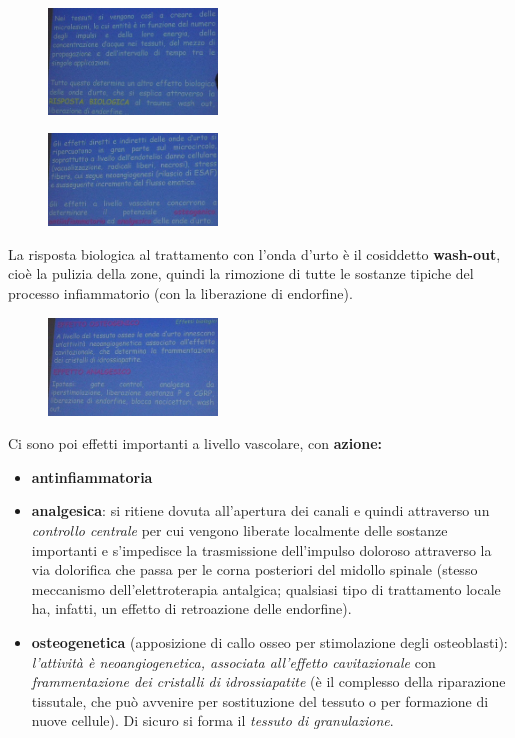 \begin{figure}[!ht]
\centering
\includegraphics[width=0.4\textwidth]{025/image13.jpeg}
\end{figure}

\begin{figure}[!ht]
\centering
\includegraphics[width=0.4\textwidth]{025/image14.jpeg}
\end{figure}

La risposta biologica al trattamento con l'onda d'urto è il cosiddetto
\textbf{wash-out}, cioè la pulizia della zone, quindi la rimozione di
tutte le sostanze tipiche del processo infiammatorio (con la liberazione
di endorfine).

\begin{figure}[!ht]
\centering
\includegraphics[width=0.4\textwidth]{025/image15.jpeg}
\end{figure}

Ci
sono poi effetti importanti a livello vascolare, con \textbf{azione:}

\begin{itemize}
\item
  \textbf{antinfiammatoria}
\item
  \textbf{analgesica}: si ritiene dovuta all'apertura dei canali e
  quindi attraverso un \emph{controllo centrale} per cui vengono
  liberate localmente delle sostanze importanti e s'impedisce la
  trasmissione dell'impulso doloroso attraverso la via dolorifica che
  passa per le corna posteriori del midollo spinale (stesso meccanismo
  dell'elettroterapia antalgica; qualsiasi tipo di trattamento locale
  ha, infatti, un effetto di retroazione delle endorfine).
\item
  \textbf{osteogenetica} (apposizione di callo osseo per stimolazione
  degli osteoblasti): \emph{l'attività è neoangiogenetica, associata
  all'effetto cavitazionale} con \emph{frammentazione dei cristalli di
  idrossiapatite} (è il complesso della riparazione tissutale, che può
  avvenire per sostituzione del tessuto o per formazione di nuove
  cellule). Di sicuro si forma il \emph{tessuto di granulazione}.
\end{itemize}


